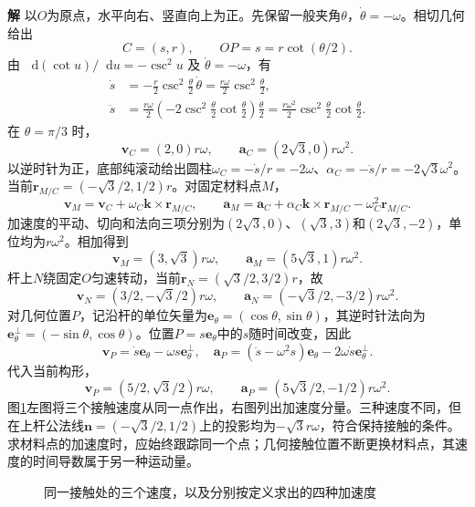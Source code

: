 \documentclass[11pt,openany,fontset=fandol]{ctexbook}
\theoremstyle{definition}\newtheorem{example}{例}[chapter]\newtheorem{exercise}{习题}[chapter]
\newcommand{\SolutionStart}{\par\medskip\ifdim\pagetotal>0pt\ifdim\dimexpr\pagegoal-\pagetotal\relax<3\baselineskip\newpage\fi\fi\noindent\textbf{解}\quad\ignorespaces}
\newenvironment{solution}{\SolutionStart}{\par\medskip}
\newcommand{\dd}{\mathop{}\!\mathrm d}\newcommand{\ee}{\mathrm e}\newcommand{\vct}[1]{\bm{#1}}
\begin{document}
\begin{solution}
以$O$为原点，水平向右、竖直向上为正。先保留一般夹角$\theta$，$\dot\theta=-\omega$。相切几何给出
\[
 C=(s,r),\qquad OP=s=r\cot(\theta/2).
\]
由 $\dd(\cot u)/\dd u=-\csc^2u$ 及 $\dot\theta=-\omega$，有
\[
\begin{aligned}
\dot s&=-\frac r2\csc^2\frac\theta2\,\dot\theta
=\frac{r\omega}{2}\csc^2\frac\theta2,\\
\ddot s&=\frac{r\omega}{2}\left(-2\csc^2\frac\theta2\cot\frac\theta2\right)
\frac{\dot\theta}{2}
=\frac{r\omega^2}{2}\csc^2\frac\theta2\cot\frac\theta2.
\end{aligned}
\]
在 $\theta=\pi/3$ 时，
\[
 \boxed{\vct v_C=(2,0)r\omega,\qquad
 \vct a_C=(2\sqrt3,0)r\omega^2.}
\]
以逆时针为正，底部纯滚动给出圆柱$\omega_C=-\dot s/r=-2\omega$、$\alpha_C=-\ddot s/r=-2\sqrt3\omega^2$。当前$\vct r_{M/C}=(-\sqrt3/2,1/2)r$。对固定材料点$M$，
\[
 \vct v_M=\vct v_C+\omega_C\vct k\times\vct r_{M/C},\qquad
 \vct a_M=\vct a_C+\alpha_C\vct k\times\vct r_{M/C}
                -\omega_C^2\vct r_{M/C}.
\]
加速度的平动、切向和法向三项分别为$(2\sqrt3,0)$、$(\sqrt3,3)$和$(2\sqrt3,-2)$，单位均为$r\omega^2$。相加得到
\[
 \boxed{\vct v_M=(3,\sqrt3)r\omega,\qquad
 \vct a_M=(5\sqrt3,1)r\omega^2.}
\]
杆上$N$绕固定$O$匀速转动，当前$\vct r_N=(\sqrt3/2,3/2)r$，故
\[
 \boxed{\vct v_N=(3/2,-\sqrt3/2)r\omega,\qquad
 \vct a_N=(-\sqrt3/2,-3/2)r\omega^2.}
\]
对几何位置$P$，记沿杆的单位矢量为$\vct e_\theta=(\cos\theta,\sin\theta)$，其逆时针法向为$\vct e_\theta^\perp=(-\sin\theta,\cos\theta)$。位置$P=s\vct e_\theta$中的$s$随时间改变，因此
\[
 \vct v_P=\dot s\vct e_\theta-\omega s\vct e_\theta^\perp,
 \quad\vct a_P=(\ddot s-\omega^2s)\vct e_\theta-2\omega\dot s\vct e_\theta^\perp.
\]
代入当前构形，
\[
 \boxed{\vct v_P=(5/2,\sqrt3/2)r\omega,\qquad
 \vct a_P=(5\sqrt3/2,-1/2)r\omega^2.}
\]
图\ref{mp2:fig:rev:wedgecyl-s}左图将三个接触速度从同一点作出，右图列出加速度分量。三种速度不同，但在上杆公法线$\vct n=(-\sqrt3/2,1/2)$上的投影均为$-\sqrt3r\omega$，符合保持接触的条件。求材料点的加速度时，应始终跟踪同一个点；几何接触位置不断更换材料点，其速度的时间导数属于另一种运动量。

\begin{figure}[H]\centering
{}
\caption{同一接触处的三个速度，以及分别按定义求出的四种加速度}\label{mp2:fig:rev:wedgecyl-s}
\end{figure}

\end{solution}
\end{document}
